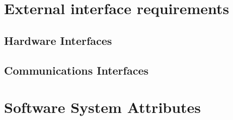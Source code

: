 \documentclass{scrreprt}
\begin{document}
\section{External interface requirements}



\subsection{Hardware Interfaces}


%

\subsection{Communications Interfaces}





%

\section{Software System Attributes}


%

\newpage
\printindex
\end{document}
